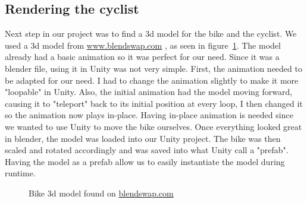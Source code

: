 \documentclass{scrartcl}
\begin{document}
	\subsection{Rendering the cyclist}
		Next step in our project was to find a 3d model for the bike and the cyclist. We used a 3d model from \url{www.blendswap.com} \parencite{Bicycle:Blender}, as 
		seen in figure~\ref{fig:bike_model}. The model already had a basic animation so it was perfect for our need. Since it 
		was a blender file, using it in Unity was not very simple. First, the animation needed to be adapted for our need. I had to change the 
		animation slightly to make it more "loopable" in Unity. Also, the initial animation had the model moving forward, causing it to "teleport" 
		back to its initial position at every loop, I then changed it so the animation now plays in-place. Having in-place animation is needed 
		since we wanted to use Unity to move the bike ourselves. Once everything looked great in blender, the model was loaded into our Unity 
		project. The bike was then scaled and rotated accordingly and was saved into what Unity call a "prefab". Having the model as a prefab allow 
		us to easily instantiate the model during runtime. 
		\begin{figure}[h]
			\caption{Bike 3d model found on \url{blendswap.com}}
			\label{fig:bike_model}
		\end{figure}
		
\end{document}

